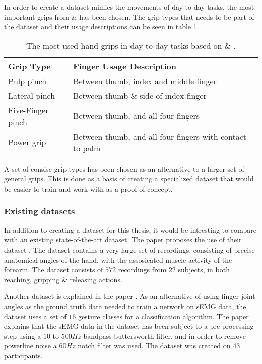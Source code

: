 \documentclass[../main.tex]{subfiles}
\begin{document}
In order to create a dataset mimics the movements of day-to-day tasks, the most important grips from \cite{sollerman} \& \cite{shap} has been chosen.
The grip types that needs to be part of the dataset and their usage descriptions can be seen in table \ref{tab:grips}.

\begin{table}[h]
\begin{center}
\begin{tabular}{ |l|l| } 
 \hline
 Grip Type & Finger Usage Description \\ 
 \hline
 Pulp pinch & Between thumb, index and middle finger \\ 
 Lateral pinch & Between thumb \& side of index finger \\ 
 Five-Finger pinch & Between thumb, and all four fingers \\ 
 Power grip & Between thumb, and all four fingers with contact to palm \\ 
 \hline
\end{tabular}
\caption{The most used hand grips in day-to-day tasks based on \cite{sollerman} \& \cite{shap}.}
\label{tab:grips}
\end{center}
\end{table}

A set of consise grip types has been chosen as an alternative to a larger set of general grips.
This is done as a basis of creating a specialized dataset that would be easier to train and work with as a proof of concept.


\subsubsection{Existing datasets}

In addition to creating a dataset for this thesis, it would be intresting to compare with an existing state-of-the-art dataset.
The paper \cite{jarque2019} proposes the use of their dataset \cite{kinmusdataset}.
The dataset contains a very large set of recordings, consisting of precise anatomical angles of the hand, with the assosicated muscle activity of the forearm.
The dataset consists of $572$ recordings from $22$ subjects, in both reaching, gripping \& releasing actions.

Another dataset is explained in the paper \cite{ashirbad2022}.
As an alternative of using finger joint angles as the ground truth data needed to train a network on sEMG data, the dataset uses a set of $16$ gesture classes for a classification algorithm.
The paper explains that the sEMG data in the dataset has been subject to a pre-processing step using a $10$ to $500Hz$ bandpass buttersworth filter, and in order to remove powerline noise a $60Hz$ notch filter was used.
The dataset was created on $43$ participants.
\end{document}
